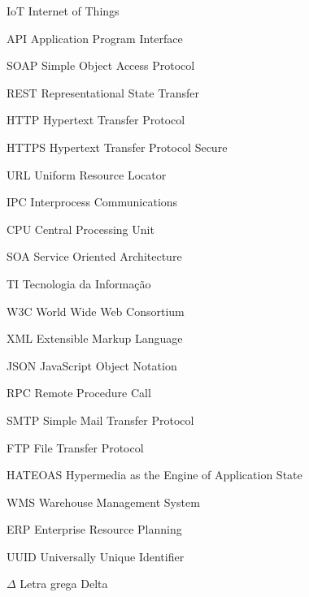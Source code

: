 \listoffigures*
\cleardoublepage

\listoftables*
\cleardoublepage
\begin{KeepFromToc}
\lstlistoflistings
\end{KeepFromToc}
\cleardoublepage

\begin{siglas}
  \item[IoT] Internet of Things
  \item[API] Application Program Interface
  \item[SOAP] Simple Object Access Protocol
  \item[REST] Representational State Transfer
  \item[HTTP] Hypertext Transfer Protocol
  \item[HTTPS] Hypertext Transfer Protocol Secure
  \item[URL] Uniform Resource Locator
  \item[IPC] Interprocess Communications
  \item[CPU] Central Processing Unit
  \item[SOA] Service Oriented Architecture
  \item[TI] Tecnologia da Informação
  \item[W3C] World Wide Web Consortium  
  \item[XML] Extensible Markup Language
  \item[JSON] JavaScript Object Notation
  \item[RPC] Remote Procedure Call
  \item[SMTP] Simple Mail Transfer Protocol
  \item[FTP] File Transfer Protocol
  \item[HATEOAS] Hypermedia as the Engine of Application State
  \item[WMS] Warehouse Management System
  \item[ERP] Enterprise Resource Planning
  \item[UUID] Universally Unique Identifier
  

\end{siglas}

\begin{simbolos}
  \item[$ \Delta $] Letra grega Delta
\end{simbolos}

\tableofcontents*
\cleardoublepage
